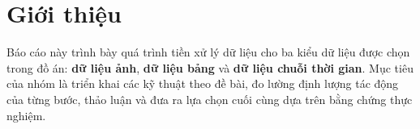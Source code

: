 \section{Giới thiệu}
Báo cáo này trình bày quá trình tiền xử lý dữ liệu cho ba kiểu dữ liệu được chọn trong đồ án: \textbf{dữ liệu ảnh}, \textbf{dữ liệu bảng} và \textbf{dữ liệu chuỗi thời gian}. Mục tiêu của nhóm là triển khai các kỹ thuật theo đề bài, đo lường định lượng tác động của từng bước, thảo luận và đưa ra lựa chọn cuối cùng dựa trên bằng chứng thực nghiệm.